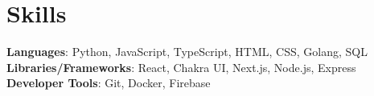 \documentclass[letterpaper,11pt]{article}
\begin{document}
\section{Skills}
 \begin{itemize}[leftmargin=0.15in, label={}]
    \small{\item{
     \textbf{Languages}{: Python, JavaScript, TypeScript, HTML, CSS, Golang, SQL} \\
     \textbf{Libraries/Frameworks}{: React, Chakra UI, Next.js, Node.js, Express} \\
     \textbf{Developer Tools}{: Git, Docker, Firebase} \\
    }}
 \end{itemize}
\end{document}
